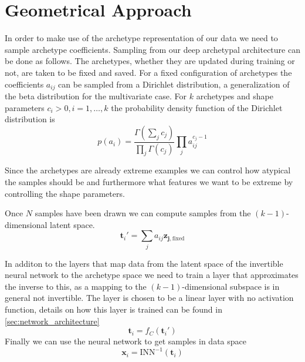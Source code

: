 \section{Geometrical Approach}%
\label{sec:geometrical_approach}

In order to make use of the archetype representation of our data we need to
sample archetype coefficients. Sampling from our deep archetypal architecture
can be done as follows. The archetypes, whether they are updated during training
or not, are taken to be fixed and saved. For a fixed configuration of
archetypes the coefficients $a_{ij}$ can be sampled from a Dirichlet distribution,
a generalization of the beta distribution for the multivariate case. For $k$
archetypes and shape parameters $c_i > 0, i = 1, \dots, k$ the probability
density function of the Dirichlet distribution is
\begin{equation}%
	\label{eq:dirichlet_pdf}
	p(a_i) = \frac{ \Gamma ( \sum_j c_j ) }{ \prod_j \Gamma (c_j) } \prod_j
	a_{ij}^{c_j - 1}
\end{equation}
\citep{forbesDirichletDistribution2010}

Since the archetypes are already extreme examples we can control how atypical
the samples should be and furthermore what features we want to be extreme by
controlling the shape parameters.

Once $N$ samples have been drawn we can compute samples from the
$(k-1)$-dimensional latent space.
\begin{equation}%
	\label{eq:aa_k_sample}
	\mathbf{t}_i' = \sum_j a_{ij} \mathbf{z_{j,\mathrm{fixed}}}
\end{equation}

In additon to the layers that map data from the latent space of the invertible
neural network to the archetype space we need to train a layer that
approximates the inverse to this, as a mapping to the $(k-1)$-dimensional
subspace is in general not invertible. The layer is chosen to be a linear layer
with no activation function, details on how this layer is trained can
be found in \autoref{sec:network_architecture}
\begin{equation}%
	\label{eq:aa_upsample}
	\mathbf{t}_i = f_C (\mathbf{t}_i')
\end{equation}
Finally we can use the neural network to get samples in data space
\begin{equation}%
	\label{eq:aa_to_data}
	\mathbf{x}_i = \mathrm{INN}^{-1} (\mathbf{t}_i)
\end{equation}

